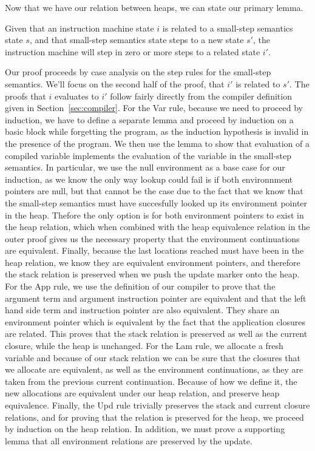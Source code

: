 Now that we have our relation between heaps, we can state our primary lemma.
\begin{lemma} \label{lem:cesm_im}
Given that an instruction machine state $i$ is related to a small-step
semantics state $s$, and that small-step semantics state steps to a new state
$s'$, the instruction machine will step in zero or more steps to a related state
$i'$.
\end{lemma}
\begin{proofoutline}
Our proof proceeds by case analysis on the step rules for the small-step
semantics. We'll focus on the second half of the proof, that $i'$ is related to
$s'$. The proofs that $i$ evaluates to $i'$ follow fairly directly from the
compiler definition given in Section~\ref{sec:compiler}. For the Var rule,
because we need to proceed by induction, we have to define a separate lemma and
proceed by induction on a basic block while forgetting the program, as the
induction hypothesis is invalid in the presence of the program. We then use the
lemma to show that evaluation of a compiled variable implements the evaluation
of the variable in the small-step semantics. In particular, we use the null
environment as a base case for our induction, as we know the only way lookup
could fail is if both environnment pointers are null, but that cannot be the
case due to the fact that we know that the small-step semantics must have
succesfully looked up its environment pointer in the heap. Thefore the only
option is for both environment pointers to exist in the heap relation, which
when combined with the heap equivalence relation in the outer proof gives us the
necessary property that the environment continuations are equivalent. Finally,
because the last locations reached must have been in the heap relation, we know
they are equivalent environment pointers, and therefore the stack relation is
preserved when we push the update marker onto the heap. For the App rule, we use
the definition of our compiler to prove that the argument term and argument
instruction pointer are equivalent and that the left hand side term and
instruction pointer are also equivalent. They share an environment pointer which
is equivalent by the fact that the application closures are related.  This
proves that the stack relation is preserved as well as the current closure,
while the heap is unchanged. For the Lam rule, we allocate a fresh variable and
because of our stack relation we can be sure that the closures that we
allocate are equivalent, as well as the environment continuations, as they are
taken from the previous current continuation. Because of how we define it, the
new allocations are equivalent under our heap relation, and preserve heap
equivalence. Finally, the Upd rule trivially preserves the stack and current
closure relations, and for proving that the relation is preserved for the
heap, we proceed by induction on the heap relation. In addition, we must prove
a supporting lemma that all environment relations are preserved by the update.
\end{proofoutline}

